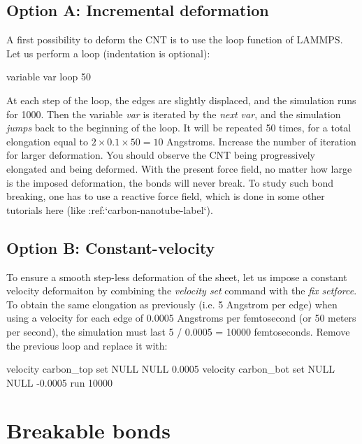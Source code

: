 \subsection{Option A: Incremental deformation}

\noindent A first possibility to deform the CNT is to 
use the loop function of LAMMPS. 
Let us perform a loop (indentation is optional):

\begin{lcverbatim}
variable var loop 50
\end{lcverbatim}

\noindent At each step of the loop, the edges are slightly displaced, and
the simulation runs for 1000. Then the variable \textit{var} is iterated
by the \textit{next var}, and the simulation \textit{jumps} back to the beginning of 
the loop. It will be repeated 50 times, for a total elongation
equal to $2 \times 0.1 \times 50 = 10$ Angstroms. Increase the number of iteration 
for larger deformation.
You should observe the CNT being progressively elongated
and being deformed.
With the present force field, no matter how large is the
imposed deformation, the bonds will never break. To study
such bond breaking, one has to use a reactive force
field, which is done in some other tutorials here (like :ref:`carbon-nanotube-label`).

\subsection{Option B: Constant-velocity}

\noindent To ensure a smooth step-less deformation of the sheet,
let us impose a constant velocity deformaiton by combining
the \textit{velocity set} command with the \textit{fix setforce}. 
To obtain the same elongation as previously (i.e. 5 Angstrom 
per edge) when using a velocity for each edge of 0.0005 Angstroms per
femtosecond (or 50 meters per second), the simulation 
must last 5 / 0.0005 = 10000 femtoseconds. 
Remove the previous loop and replace it with:

\begin{lcverbatim}
velocity carbon_top set NULL NULL 0.0005
velocity carbon_bot set NULL NULL -0.0005
run 10000
\end{lcverbatim}

\noindent \section{Breakable bonds}

